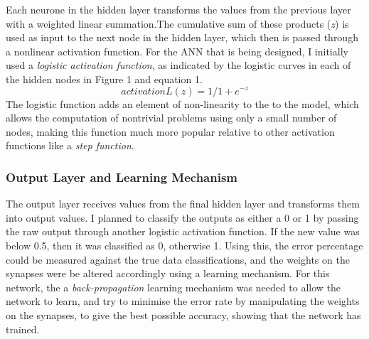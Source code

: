 \documentclass[11pt]{article}
\begin{document}
Each neurone in the hidden layer transforms the values from the previous layer with a weighted linear summation.The cumulative sum of these products (\textit{z}) is used as input to the next node in the hidden layer, which then is passed through a nonlinear activation function. For the ANN that is being designed, I initially used a \textit{logistic activation function}, as indicated by the logistic curves in each of the hidden nodes in Figure 1 and equation 1. \begin{equation} activationL(z) = 1/1+e^{-z} \end{equation}
The logistic function adds an element of non-linearity to the to the model, which allows the computation of nontrivial problems using only a small number of nodes, making this function much more popular relative to other activation functions like a \textit{step function}.
\subsubsection{Output Layer and Learning Mechanism}
The output layer receives values from the final hidden layer and transforms them into output values. I planned to classify the outputs as either a 0 or 1 by passing the raw output through another logistic activation function. If the new value was below 0.5, then it was classified as 0, otherwise 1. Using this, the error percentage could be measured against the true data classifications, and the weights on the synapses were be altered accordingly using a learning mechanism. For this network, the a \textit{back-propagation} learning mechanism was needed to allow the network to learn, and try to minimise the error rate by manipulating the weights on the synapses, to give the best possible accuracy, showing that the network has trained.\\
\end{document}
